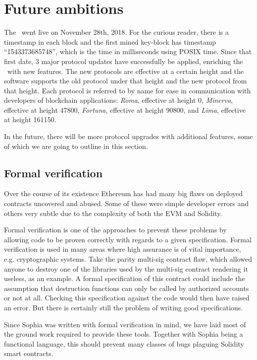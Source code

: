 \section{Future ambitions}

The \blockchain\ went live on November 28th, 2018. For the curious reader,
there is a timestamp in each block and the first mined key-block has timestamp
``1543373685748'', which is the time in milliseconds using POSIX time. Since
that first date, 3 major protocol updates have successfully be applied,
enriching the \blockchain\ with new features. The new protocols are effective
at a certain height and the software supports the old protocol under that
height and the new protocol from that height. Each protocol is referred to by
name for ease in communication with developers of blockchain applications:
\textit{Roma}, effective at height 0, \textit{Minerva}, effective at height
47800, \textit{Fortuna}, effective at height 90800, and \textit{Lima},
effective at height 161150.

In the future, there will be more protocol upgrades with additional features,
some of which we are going to outline in this section.

\subsection{Formal verification}

Over the course of its existence Ethereum has had many big flaws on deployed
contracts uncovered and abused. Some of these were simple developer errors and
others very subtle due to the complexity of both the EVM and Solidity.

Formal verification is one of the approaches to prevent these problems by
allowing code to be proven correctly with regards to a given specification.
Formal verification is used in many areas where high assurance is of vital
importance, e.g. cryptographic systems.
Take the parity multi-sig contract flaw, which allowed anyone to destroy one of
the libraries used by the multi-sig contract rendering it useless, as an
example. A formal specification of this contract could include the assumption
that destruction functions can only be called by authorized accounts or not at
all. Checking this specification against the code would then have raised an
error. But there is certainly still the problem of writing good specifications.

Since Sophia was written with formal verification in mind, we have laid most of
the ground work required to provide these tools. Together with Sophia being a
functional language, this should prevent many classes of bugs plaguing Solidity
smart contracts.

